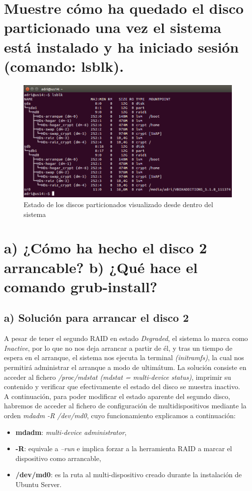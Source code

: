 \section{Muestre cómo ha quedado el disco particionado una vez el sistema está instalado y ha iniciado sesión (comando: lsblk).}
\begin{figure}[H]
	\centering
	\includegraphics[scale=0.5]{lsblk-captura}
	\caption{Estado de los discos particionados visualizado desde dentro del sistema}
	\label{fig:figura1}
\end{figure}

\section{a) ¿Cómo ha hecho el disco 2 arrancable? b) ¿Qué hace el comando grub-install?}

\subsection{a) Solución para arrancar el disco 2}
A pesar de tener el segundo RAID en estado \emph{Degraded}, el sistema lo marca como \emph{Inactive}, por lo que no nos deja arrancar a partir
de él, y tras un tiempo de espera en el arranque, el sistema nos ejecuta la terminal \emph{(initramfs)}, la cual nos permitirá administrar el arranque
a modo de ultimátum. La solución consiste en acceder al fichero \emph{/proc/mdstat (mdstat = multi-device status)}, imprimir su contenido y verificar 
que efectivamente el estado del disco se muestra inactivo. \\
A continuación, para poder modificar el estado aparente del segundo disco, habremos de acceder al fichero de configuración de multidispositivos
mediante la orden \emph{mdadm -R /dev/md0}, cuyo funcionamiento explicamos a continuación:
\begin{itemize}
	\item \textbf{mdadm}: \emph{multi-device administrator},
	\item \textbf{-R}: equivale a \emph{--run} e implica forzar a la herramienta RAID a marcar el dispositivo como arrancable,
	\item \textbf{/dev/md0}: es la ruta al multi-dispositivo creado durante la instalación de Ubuntu Server.
\end{itemize} 

